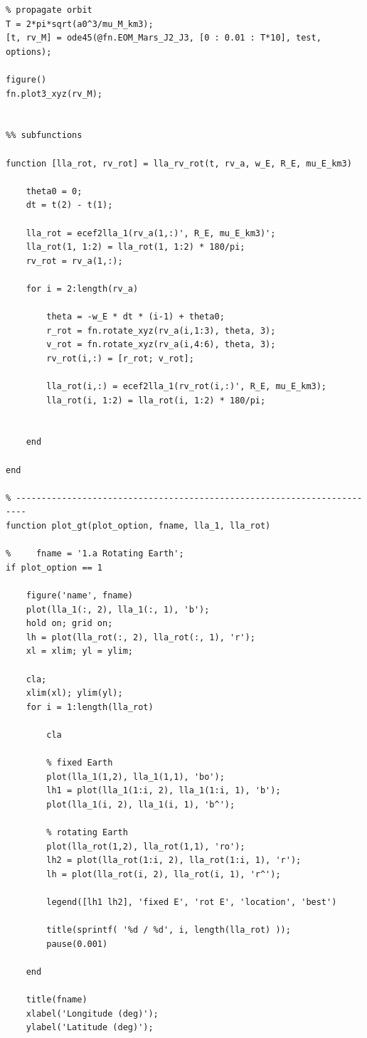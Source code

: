 \documentclass[conf]{new-aiaa}
\begin{document}
\begin{lstlisting}
% propagate orbit 
T = 2*pi*sqrt(a0^3/mu_M_km3); 
[t, rv_M] = ode45(@fn.EOM_Mars_J2_J3, [0 : 0.01 : T*10], test, options); 

figure()
fn.plot3_xyz(rv_M); 


%% subfunctions 

function [lla_rot, rv_rot] = lla_rv_rot(t, rv_a, w_E, R_E, mu_E_km3)

    theta0 = 0; 
    dt = t(2) - t(1); 

    lla_rot = ecef2lla_1(rv_a(1,:)', R_E, mu_E_km3)'; 
    lla_rot(1, 1:2) = lla_rot(1, 1:2) * 180/pi; 
    rv_rot = rv_a(1,:); 
    
    for i = 2:length(rv_a)

        theta = -w_E * dt * (i-1) + theta0; 
        r_rot = fn.rotate_xyz(rv_a(i,1:3), theta, 3); 
        v_rot = fn.rotate_xyz(rv_a(i,4:6), theta, 3); 
        rv_rot(i,:) = [r_rot; v_rot]; 

        lla_rot(i,:) = ecef2lla_1(rv_rot(i,:)', R_E, mu_E_km3); 
        lla_rot(i, 1:2) = lla_rot(i, 1:2) * 180/pi; 


    end 

end 

% ------------------------------------------------------------------------
function plot_gt(plot_option, fname, lla_1, lla_rot)

%     fname = '1.a Rotating Earth'; 
if plot_option == 1

    figure('name', fname)
    plot(lla_1(:, 2), lla_1(:, 1), 'b'); 
    hold on; grid on; 
    lh = plot(lla_rot(:, 2), lla_rot(:, 1), 'r'); 
    xl = xlim; yl = ylim; 

    cla;  
    xlim(xl); ylim(yl); 
    for i = 1:length(lla_rot)

        cla 

        % fixed Earth 
        plot(lla_1(1,2), lla_1(1,1), 'bo'); 
        lh1 = plot(lla_1(1:i, 2), lla_1(1:i, 1), 'b'); 
        plot(lla_1(i, 2), lla_1(i, 1), 'b^'); 

        % rotating Earth 
        plot(lla_rot(1,2), lla_rot(1,1), 'ro'); 
        lh2 = plot(lla_rot(1:i, 2), lla_rot(1:i, 1), 'r'); 
        lh = plot(lla_rot(i, 2), lla_rot(i, 1), 'r^'); 

        legend([lh1 lh2], 'fixed E', 'rot E', 'location', 'best') 

        title(sprintf( '%d / %d', i, length(lla_rot) )); 
        pause(0.001) 

    end 
    
    title(fname) 
    xlabel('Longitude (deg)'); 
    ylabel('Latitude (deg)');


\end{lstlisting}
\end{document}
